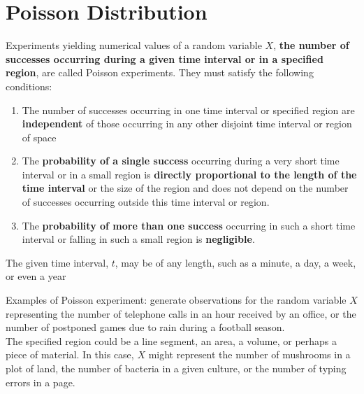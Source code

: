 \section{Poisson Distribution}
\begin{definition}
Experiments yielding numerical values of a random variable $X$, \textbf{the number of successes occurring during a given time interval or in a specified region}, are called Poisson experiments. They must satisfy the following conditions:
\begin{enumerate}
    \item The number of successes occurring in one time interval or specified region are \textbf{independent} of those occurring in any other disjoint time interval or region of space
    \item The \textbf{probability of a single success} occurring during a very short time interval or in a small region is \textbf{directly proportional to the length of the time interval} or the size of the region and does not depend on the number of successes occurring outside this time interval or region.
    \item The \textbf{probability of more than one success} occurring in such a short time interval or falling in such a small region is \textbf{negligible}.
\end{enumerate}
The given time interval, $t$, may be of any length, such as a minute, a day, a week, or even a year
\end{definition}
Examples of Poisson experiment: generate observations for the random variable $X$ representing the number of telephone calls in an hour received by an office, or the number of postponed games due to rain during a football season. \\
The specified region could be a line segment, an area, a volume, or perhaps a piece of material. In this case, $X$ might represent the number of mushrooms in a plot of land, the number of bacteria in a given culture, or the number of typing errors in a page.

